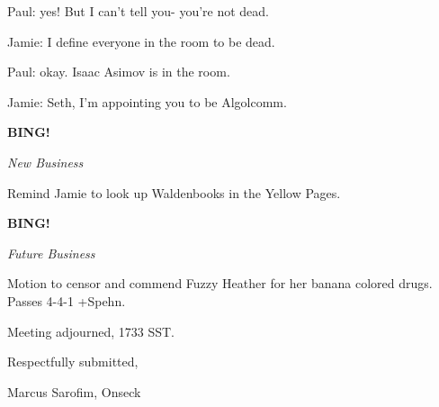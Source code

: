 \documentclass[12pt]{article}
\newcommand{\bing}{{\bf BING!} }
\newcommand{\goto}[1]{\bing \vskip 12pt \centerline{{\em{#1}}}}
\begin{document}
Paul: yes! But I can't tell you- you're not dead.

Jamie: I define everyone in the room to be dead.

Paul: okay. Isaac Asimov is in the room.

Jamie: Seth, I'm appointing you to be Algolcomm.

\goto{New Business}

Remind Jamie to look up Waldenbooks in the Yellow Pages.

\goto{Future Business}

Motion to censor and commend Fuzzy Heather for her banana colored drugs. Passes 4-4-1 +Spehn.

\vspace{12pt}

\noindent
Meeting adjourned, 1733 SST.

\vspace{18pt}

\centerline{Respectfully submitted,}
\centerline{Marcus Sarofim, Onseck}
\end{document}
